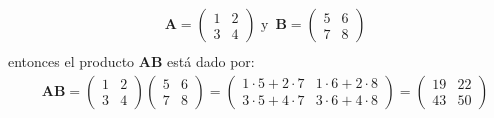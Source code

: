 \begin{example}
$$\begin{aligned}
& \boldsymbol{A}=\left(\begin{array}{ll}
1 & 2 \\
3 & 4
\end{array}\right) \,\,\text{y}\,\,\, \boldsymbol{B}=\left(\begin{array}{ll}
5 & 6 \\
7 & 8
\end{array}\right)\\    
\end{aligned}$$
entonces el producto $\boldsymbol{AB}$ está dado por:
 $$
\begin{aligned}
& \boldsymbol{AB}=\left(\begin{array}{ll}
1 & 2 \\
3 & 4
\end{array}\right) \left(\begin{array}{ll}
5 & 6 \\
7 & 8
\end{array}\right)=\left(\begin{array}{ll}
1 \cdot 5+2 \cdot 7 & 1 \cdot 6+2 \cdot 8 \\
3 \cdot 5+4 \cdot 7 & 3 \cdot 6+4 \cdot 8
\end{array}\right)=\left(\begin{array}{ll}
19 & 22 \\
43 & 50
\end{array}\right) \\
\end{aligned}
$$ 
\end{example}

